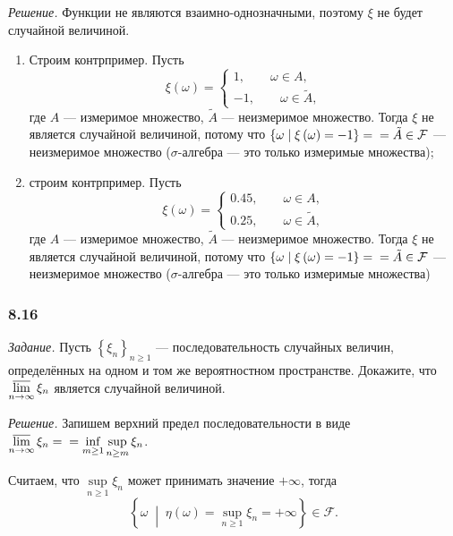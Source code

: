\textit{Решение.} Функции не являются взаимно-однозначными, поэтому $ \xi $ не будет случайной величиной.
 \begin{enumerate}[label=\alph*)]
\item Строим контрпример.
Пусть
$$ \xi \left( \omega \right) =
\begin{cases}
1, \qquad \omega \in A, \\
- 1, \qquad \omega \in \tilde{A},
\end{cases}
$$
где $A$ --- измеримое множество, $ \tilde{A} $ --- неизмеримое множество.
Тогда $ \xi $ не является случайной величиной,
потому что $ \left\{ \omega \; \middle| \; \xi \left( \omega \right) = - 1 \right\} = \\
= \tilde{A} \in \mathcal{F} $ ---
неизмеримое множество ($ \sigma $-алгебра --- это только измеримые множества);
\item строим контрпример.
Пусть
$$ \xi \left( \omega \right) =
\begin{cases}
0.45, \qquad \omega \in A, \\
0.25, \qquad \omega \in \tilde{A},
\end{cases}
$$
где $A$ --- измеримое множество, $ \tilde{A} $ --- неизмеримое множество.
Тогда $ \xi $ не является случайной величиной,
потому что $ \left\{ \omega \; \middle| \; \xi \left( \omega \right) = - 1 \right\} = \\
= \tilde{A} \in \mathcal{F} $ ---
неизмеримое множество ($ \sigma $-алгебра --- это только измеримые множества)
\end{enumerate}

\subsubsection*{8.16}

\textit{Задание.} Пусть $ \left\{ \xi_n \right\}_{n \geq 1} $ --- последовательность случайных величин, определённых на одном и том же вероятностном пространстве.
Докажите, что $ \varlimsup \limits_{n \rightarrow \infty } \xi_n $ является случайной величиной. 

\textit{Решение.}
Запишем верхний предел последовательности в виде $ \varlimsup \limits_{n \rightarrow \infty } \xi_n = \\
= \inf \limits_{m \geq 1} \sup \limits_{n \geq m} \xi_n$.

Считаем, что $ \sup \limits_{n \geq 1} \xi_n $ может принимать значение $+ \infty $,
тогда
$$ \left\{ \omega \; \middle| \; \eta \left( \omega \right) =
\sup \limits_{n \geq 1} \xi_n =
+ \infty \right\} \in \mathcal{F}.$$

